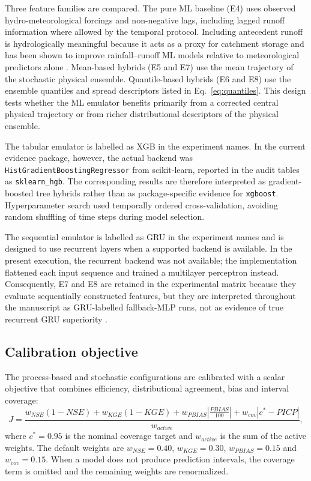 Three feature families are compared. The pure ML baseline (E4) uses
observed hydro-meteorological forcings and non-negative lags, including
lagged runoff information where allowed by the temporal protocol.
Including antecedent runoff is hydrologically meaningful because it
acts as a proxy for catchment storage and has been shown to improve
rainfall--runoff ML models relative to meteorological predictors alone
\citep{adnan2021comparison}. Mean-based hybrids (E5 and E7) use the
mean trajectory of the stochastic physical ensemble. Quantile-based
hybrids (E6 and E8) use the ensemble quantiles and spread descriptors
listed in Eq.~\ref{eq:quantiles}. This design tests whether the ML
emulator benefits primarily from a corrected central physical trajectory
or from richer distributional descriptors of the physical ensemble.

The tabular emulator is labelled as XGB in the experiment names. In the
current evidence package, however, the actual backend was
\texttt{HistGradientBoostingRegressor} from scikit-learn, reported in
the audit tables as \texttt{sklearn\_hgb}. The corresponding results
are therefore interpreted as gradient-boosted tree hybrids rather than
as package-specific evidence for \texttt{xgboost}. Hyperparameter search
used temporally ordered cross-validation, avoiding random shuffling of
time steps during model selection.

The sequential emulator is labelled as GRU in the experiment names and
is designed to use recurrent layers when a supported backend is
available. In the present execution, the recurrent backend was not
available; the implementation flattened each input sequence and trained
a multilayer perceptron instead. Consequently, E7 and E8 are retained in
the experimental matrix because they evaluate sequentially constructed
features, but they are interpreted throughout the manuscript as
GRU-labelled fallback-MLP runs, not as evidence of true recurrent GRU
superiority \citep{kratzert2018rainfall,kratzert2019towards}.

\subsection{Calibration objective}\label{subsec:calibration}

The process-based and stochastic configurations are calibrated with a
scalar objective that combines efficiency, distributional agreement,
bias and interval coverage:
\begin{equation}
J = \frac{w_{NSE}(1-NSE) + w_{KGE}(1-KGE)
  + w_{PBIAS}\left|\frac{PBIAS}{100}\right|
  + w_{cov}|c^*-PICP|}{w_{active}},
\label{eq:objective}
\end{equation}
where $c^*=0.95$ is the nominal coverage target and $w_{active}$ is the
sum of the active weights. The default weights are $w_{NSE}=0.40$,
$w_{KGE}=0.30$, $w_{PBIAS}=0.15$ and $w_{cov}=0.15$. When a model does
not produce prediction intervals, the coverage term is omitted and the
remaining weights are renormalized.

